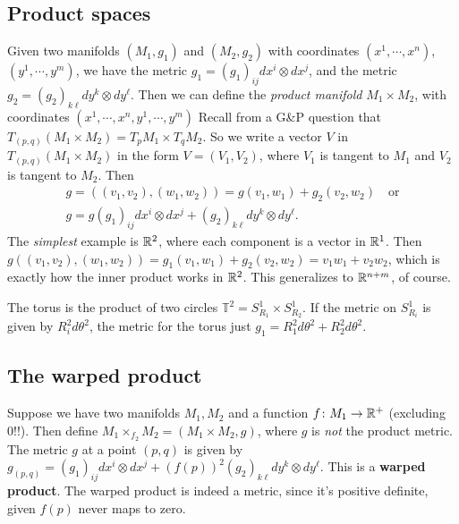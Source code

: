        \subsection{Product spaces}
        Given two manifolds $(M_1,g_1)$ and $(M_2,g_2)$ with coordinates $(x^1,\cdots ,x^n )$, $(y^1,\cdots ,y^m )$, we have the metric $g_1=(g_1)_{ij}dx^i \otimes dx^j $, and the metric $g_2=(g_2)_{k\ell}dy^{k}\otimes dy^{\ell}$. Then we can define the \emph{product manifold} $M_1 \times  M_2$, with coordinates $(x^1,\cdots ,x^n , y^1,\cdots ,y^m)$ Recall from a G\&{}P question that $T_{(p,q)}(M_1\times M_2)=T_pM_1 \times T_q M_2$. So we write a vector $V$ in $T_{(p,q)}(M_1\times M_2)$ in the form $V=(V_1,V_2) $, where $V_1$ is tangent to $M_1$ and $V_2$ is tangent to $M_2$. Then 
        \begin{gather*}
            g=((v_1,v_2),(w_1,w_2))=g(v_1,w_1)+g_2(v_2,w_2) \quad \text{or} \\
            g=g(g_1)_{ij}dx^i \otimes dx^j  + (g_2)_{k\ell}dy^k\otimes dy ^{\ell}.
        \end{gather*}
        The \emph{simplest} example is $\mathbb{R}^2$, where each component is a vector in $\mathbb{R}^1$. Then $g((v_1,v_2),(w_1,w_2))=g_1(v_1,w_1)+g_2(v_2,w_2)=v_1w_1+v_2w_2$, which is exactly how the inner product works in $\mathbb{R}^2$. This generalizes to $\mathbb{R}^{n+m}$, of course.
\begin{example}
    The torus is the product of two circles $\mathbb{T}^2=S^1 _{R_1}\times S^1 _{R_2}$. If the metric on $S^1 _{R_i}$ is given by $R_i^2d\theta^2$, the metric for the torus just $g_1=R_1^2d\theta^2+ R_2^2 d\theta ^2$. 
\end{example}

\subsection{The warped product}
Suppose we have two manifolds $M_1,M_2$ and a function $f \colon M_1 \to \mathbb{R}^+$ (excluding 0!!). Then define $M_1 \times _{f_2}M_2=(M_1 \times  M_2,g)$, where $g$ is \emph{not} the product metric. The metric $g$ at a point $(p,q)$ is given by $g_{(p,q)}=(g_1)_{ij}dx^i  \otimes dx^j +(f(p))^2 (g_2)_{k\ell}dy^k\otimes dy^{\ell}$. This is a \textbf{warped product}. The warped product is indeed a metric, since it's positive definite, given $f(p)$ never maps to zero.

